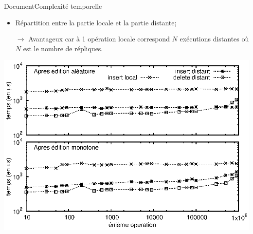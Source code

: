 \begin{frame}{Document}{Complexité temporelle}

  \begin{center}
    
  \end{center}
  
  \vspace{0.5cm}\hspace{-1cm}  
  \begin{minipage}{0.51\textwidth}
    \begin{itemize}
    \item Répartition entre la partie locale et la partie distante;
    \item [$\rightarrow$] Avantageux car à 1 opération locale correspond $N$
      exécutions distantes où $N$ est le nombre de répliques.
    \end{itemize}    
  \end{minipage}
  \hfill
  \begin{minipage}{0.48\textwidth}
    \includegraphics[width=1.2\textwidth]{img/replication/time.eps}
  \end{minipage}

  
\end{frame}



